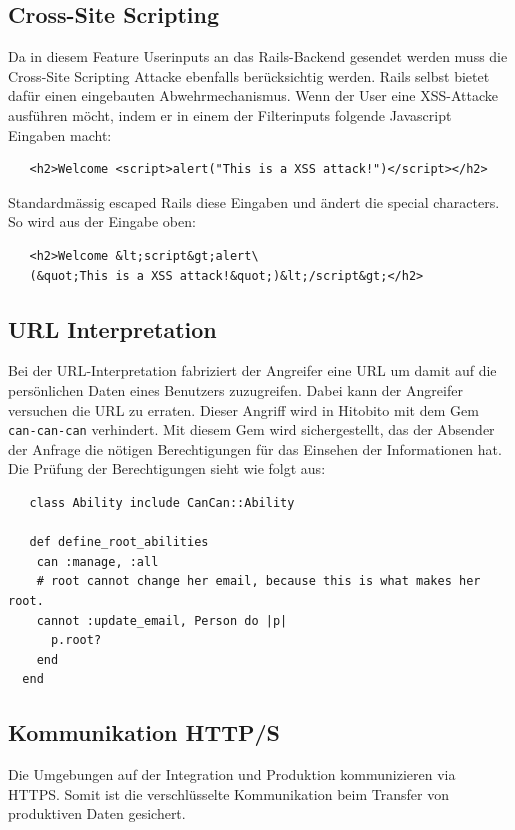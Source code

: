 \subsection{Cross-Site Scripting}
Da in diesem Feature Userinputs an das Rails-Backend gesendet werden muss die Cross-Site Scripting Attacke ebenfalls
berücksichtig werden. Rails selbst bietet dafür einen eingebauten Abwehrmechanismus. Wenn der User eine XSS-Attacke ausführen möcht,
indem er in einem der Filterinputs folgende Javascript Eingaben macht:

\begin{verbatim}
   <h2>Welcome <script>alert("This is a XSS attack!")</script></h2>
\end{verbatim}

Standardmässig escaped Rails diese Eingaben und ändert die special characters. So wird aus der Eingabe oben:

\begin{verbatim}
   <h2>Welcome &lt;script&gt;alert\
   (&quot;This is a XSS attack!&quot;)&lt;/script&gt;</h2>
\end{verbatim}

\newpage

\subsection{URL Interpretation}
Bei der URL-Interpretation fabriziert der Angreifer eine URL um damit auf die persönlichen
Daten eines Benutzers zuzugreifen. Dabei kann der Angreifer versuchen die URL zu erraten. 
Dieser Angriff wird in Hitobito mit dem Gem \texttt{can-can-can} verhindert. Mit diesem Gem wird sichergestellt,
das der Absender der Anfrage die nötigen Berechtigungen für das Einsehen der Informationen hat. Die Prüfung der Berechtigungen sieht wie folgt
aus: 

\begin{verbatim}
   class Ability include CanCan::Ability

   def define_root_abilities
    can :manage, :all
    # root cannot change her email, because this is what makes her root.
    cannot :update_email, Person do |p|
      p.root?
    end
  end
\end{verbatim}

\subsection{Kommunikation HTTP/S}
Die Umgebungen auf der Integration und Produktion kommunizieren via HTTPS. Somit ist
die verschlüsselte Kommunikation beim Transfer von produktiven Daten gesichert.

